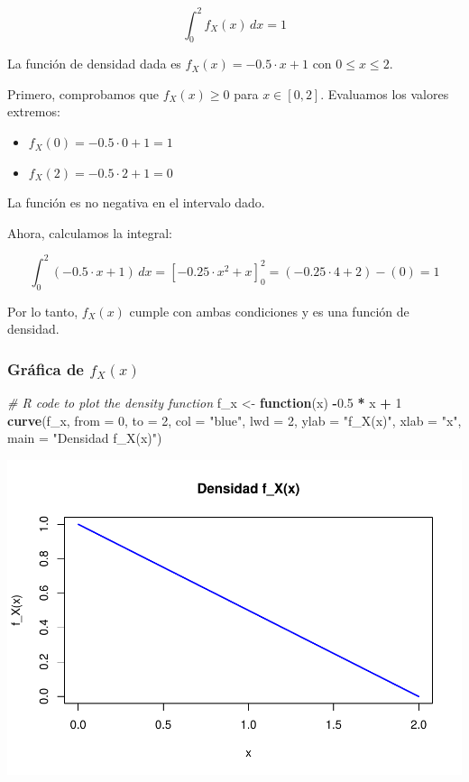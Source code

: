 \documentclass[
]{article}
\newenvironment{Shaded}{\begin{snugshade}}{\end{snugshade}}
\newcommand{\AttributeTok}[1]{\textcolor[rgb]{0.13,0.29,0.53}{#1}}
\newcommand{\CommentTok}[1]{\textcolor[rgb]{0.56,0.35,0.01}{\textit{#1}}}
\newcommand{\ControlFlowTok}[1]{\textcolor[rgb]{0.13,0.29,0.53}{\textbf{#1}}}
\newcommand{\DecValTok}[1]{\textcolor[rgb]{0.00,0.00,0.81}{#1}}
\newcommand{\FloatTok}[1]{\textcolor[rgb]{0.00,0.00,0.81}{#1}}
\newcommand{\FunctionTok}[1]{\textcolor[rgb]{0.13,0.29,0.53}{\textbf{#1}}}
\newcommand{\NormalTok}[1]{#1}
\newcommand{\OtherTok}[1]{\textcolor[rgb]{0.56,0.35,0.01}{#1}}
\newcommand{\SpecialCharTok}[1]{\textcolor[rgb]{0.81,0.36,0.00}{\textbf{#1}}}
\newcommand{\StringTok}[1]{\textcolor[rgb]{0.31,0.60,0.02}{#1}}
\providecommand{\tightlist}{%
  \setlength{\itemsep}{0pt}\setlength{\parskip}{0pt}}
\begin{document}
\[
\int_0^2 f_X(x) \, dx = 1
\]

La función de densidad dada es \(f_X(x) = -0.5 \cdot x + 1\) con \(0 \leq x \leq 2\).

Primero, comprobamos que \(f_X(x) \geq 0\) para \(x \in [0, 2]\). Evaluamos los valores extremos:

\begin{itemize}
\tightlist
\item
  \(f_X(0) = -0.5 \cdot 0 + 1 = 1\)
\item
  \(f_X(2) = -0.5 \cdot 2 + 1 = 0\)
\end{itemize}

La función es no negativa en el intervalo dado.

Ahora, calculamos la integral:

\[
\int_0^2 (-0.5 \cdot x + 1) \, dx = \left[ -0.25 \cdot x^2 + x \right]_0^2 = (-0.25 \cdot 4 + 2) - (0) = 1
\]

Por lo tanto, \(f_X(x)\) cumple con ambas condiciones y es una función de densidad.

\subsubsection{\texorpdfstring{Gráfica de \(f_X(x)\)}{Gráfica de f\_X(x)}}\label{gruxe1fica-de-f_xx}

\begin{Shaded}
\begin{Highlighting}[]
\CommentTok{\# R code to plot the density function}
\NormalTok{f\_x }\OtherTok{\textless{}{-}} \ControlFlowTok{function}\NormalTok{(x) }\SpecialCharTok{{-}}\FloatTok{0.5} \SpecialCharTok{*}\NormalTok{ x }\SpecialCharTok{+} \DecValTok{1}
\FunctionTok{curve}\NormalTok{(f\_x, }\AttributeTok{from =} \DecValTok{0}\NormalTok{, }\AttributeTok{to =} \DecValTok{2}\NormalTok{, }\AttributeTok{col =} \StringTok{"blue"}\NormalTok{, }\AttributeTok{lwd =} \DecValTok{2}\NormalTok{, }\AttributeTok{ylab =} \StringTok{"f\_X(x)"}\NormalTok{, }\AttributeTok{xlab =} \StringTok{"x"}\NormalTok{,}
      \AttributeTok{main =} \StringTok{"Densidad f\_X(x)"}\NormalTok{)}
\end{Highlighting}
\end{Shaded}

\includegraphics{Ejercicios-de-Inferencia-Estadistica_files/figure-latex/unnamed-chunk-14-1.pdf}
\end{document}

